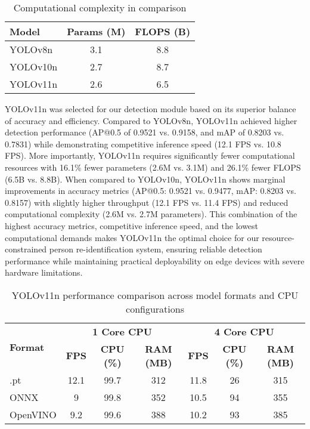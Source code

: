 \begin{table}[h]
\centering
\caption{Computational complexity in comparison}
\label{tab:computational_complexity}
\begin{tabular}{|l|c|c|}
\hline
\textbf{Model} & \textbf{Params (M)} & \textbf{FLOPS (B)} \\
\hline
YOLOv8n & 3.1 & 8.8 \\
\hline
YOLOv10n & 2.7 & 8.7 \\
\hline
YOLOv11n & 2.6 & 6.5 \\
\hline
\end{tabular}
\end{table}

YOLOv11n was selected for our detection module based on its superior balance of accuracy and efficiency. Compared to YOLOv8n, YOLOv11n achieved higher detection performance (AP@0.5 of 0.9521 vs. 0.9158, and mAP of 0.8203 vs. 0.7831) while demonstrating competitive inference speed (12.1 FPS vs. 10.8 FPS). More importantly, YOLOv11n requires significantly fewer computational resources with 16.1\% fewer parameters (2.6M vs. 3.1M) and 26.1\% fewer FLOPS (6.5B vs. 8.8B). When compared to YOLOv10n, YOLOv11n shows marginal improvements in accuracy metrics (AP@0.5: 0.9521 vs. 0.9477, mAP: 0.8203 vs. 0.8157) with slightly higher throughput (12.1 FPS vs. 11.4 FPS) and reduced computational complexity (2.6M vs. 2.7M parameters). This combination of the highest accuracy metrics, competitive inference speed, and the lowest computational demands makes YOLOv11n the optimal choice for our resource-constrained person re-identification system, ensuring reliable detection performance while maintaining practical deployability on edge devices with severe hardware limitations.

\begin{table}[h]
\centering
\caption{YOLOv11n performance comparison across model formats and CPU configurations}
\label{tab:yolov11n_performance}
\begin{tabular}{|l|c|c|c|c|c|c|}
\hline
\multirow{2}{*}{\textbf{Format}} & \multicolumn{3}{c|}{\textbf{1 Core CPU}} & \multicolumn{3}{c|}{\textbf{4 Core CPU}} \\
\cline{2-7}
 & \textbf{FPS} & \textbf{CPU (\%)} & \textbf{RAM (MB)} & \textbf{FPS} & \textbf{CPU (\%)} & \textbf{RAM (MB)} \\
\hline
.pt & 12.1 & 99.7 & 312 & 11.8 & 26 & 315 \\
\hline
ONNX & 9 & 99.8 & 352 & 10.5 & 94 & 355 \\
\hline
OpenVINO & 9.2 & 99.6 & 388 & 10.2 & 93 & 385 \\
\hline
\end{tabular}
\end{table}


